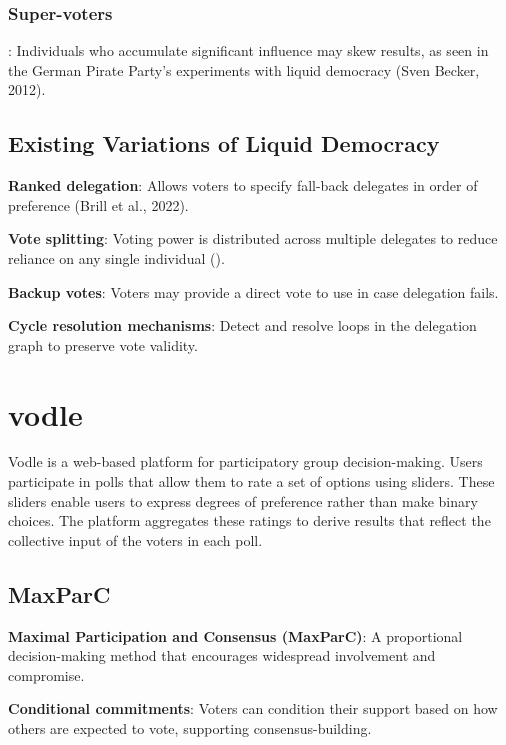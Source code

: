 \subsubsection{Super-voters}: Individuals who accumulate significant influence may skew results, as seen in the German Pirate Party's experiments with liquid democracy (Sven Becker, 2012).


\subsection{Existing Variations of Liquid Democracy}

\textbf{Ranked delegation}: Allows voters to specify fall-back delegates in order of preference (Brill et al., 2022).

\textbf{Vote splitting}: Voting power is distributed across multiple delegates to reduce reliance on any single individual (\cite{golz_fluid_2021}).

\textbf{Backup votes}: Voters may provide a direct vote to use in case delegation fails.

\textbf{Cycle resolution mechanisms}: Detect and resolve loops in the delegation graph to preserve vote validity.

\section{vodle}
Vodle is a web-based platform for participatory group decision-making. Users participate in polls that allow them to rate a set of options using sliders. These sliders enable users to express degrees of preference rather than make binary choices. The platform aggregates these ratings to derive results that reflect the collective input of the voters in each poll.

\subsection{MaxParC}

\textbf{Maximal Participation and Consensus (MaxParC)}: A proportional decision-making method that encourages widespread involvement and compromise.

\textbf{Conditional commitments}: Voters can condition their support based on how others are expected to vote, supporting consensus-building.

